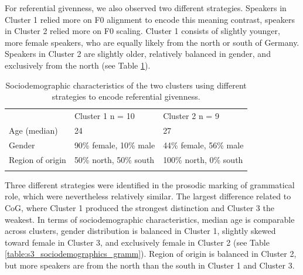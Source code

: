For referential givenness, we also observed two different strategies. Speakers in Cluster 1 relied more on F0 alignment to encode this meaning contrast, speakers in Cluster 2 relied more on F0 scaling. Cluster 1 consists of slightly younger, more female speakers, who are equally likely from the north or south of Germany. Speakers in Cluster 2 are slightly older, relatively balanced in gender, and exclusively from the north (see Table \ref{table:s3_sociodemographics_referential}). 

\begin{table}[]
\begin{tabularx}{\textwidth}{lXX}
\lsptoprule
\multicolumn{3}{c}{Referential givenness} \\ \hline
                 & Cluster 1 \newline n = 10   & Cluster 2 \newline n = 9     \\ \hline
Age (median)     & 24                     & 27                     \\
Gender           & 90\% female, 10\% male & 44\% female, 56\% male \\
Region of origin & 50\% north, 50\% south & 100\% north, 0\% south \\
\lspbottomrule
\end{tabularx}
\caption{Sociodemographic characteristics of the two clusters using different strategies to encode referential givenness.}
\label{table:s3_sociodemographics_referential}
\end{table}

Three different strategies were identified in the prosodic marking of grammatical role, which were nevertheless relatively similar. The largest difference related to CoG, where Cluster 1 produced the strongest distinction and Cluster 3 the weakest. In terms of sociodemographic characteristics, median age is comparable across clusters, gender distribution is balanced in Cluster 1, slightly skewed toward female in Cluster 3, and exclusively female in Cluster 2 (see Table \ref{table:s3_sociodemographics_gramm}). Region of origin is balanced in Cluster 2, but more speakers are from the north than the south in Cluster 1 and Cluster 3. 

